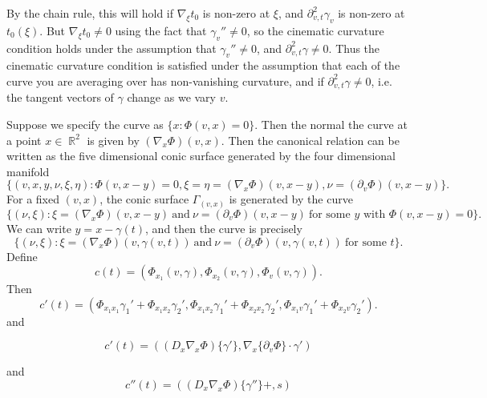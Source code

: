 \documentclass{article}
\theoremstyle{plain}
\theoremstyle{remark}
\theoremstyle{definition}
\DeclareMathOperator{\RR}{\mathbb{R}}
\begin{document}

 By the chain rule, this will hold if $\nabla_\xi t_0$ is non-zero at $\xi$, and $\partial^2_{v,t} \gamma_v$ is non-zero at $t_0(\xi)$. But  $\nabla_\xi t_0 \neq 0$ using the fact that $\gamma_v'' \neq 0$, so the cinematic curvature condition holds under the assumption that $\gamma_v'' \neq 0$, and $\partial^2_{v,t} \gamma \neq 0$. Thus the cinematic curvature condition is satisfied under the assumption that each of the curve you are averaging over has non-vanishing curvature, and if $\partial^2_{v,t} \gamma \neq 0$, i.e. the tangent vectors of $\gamma$ change as we vary $v$.



\newpage

Suppose we specify the curve as $\{ x : \Phi(v,x) = 0 \}$. Then the normal the curve at a point $x \in \RR^2$ is given by $(\nabla_x \Phi)(v,x)$. Then the canonical relation can be written as the five dimensional conic surface generated by the four dimensional manifold
%
\[ \Big\{ (v,x,y,\nu,\xi,\eta) : \Phi(v, x - y) = 0, \xi = \eta = (\nabla_x \Phi)(v,x-y), \nu = (\partial_v \Phi)(v,x - y) \Big\}. \]
%
For a fixed $(v,x)$, the conic surface $\Gamma_{(v,x)}$ is generated by the curve
%
\[ \Big\{ (\nu,\xi) : \xi = (\nabla_x \Phi)(v,x-y)\ \text{and}\ \nu = (\partial_v \Phi)(v, x - y)\ \text{for some $y$ with $\Phi(v,x-y) = 0$} \Big\}. \]
%
We can write $y = x - \gamma(t)$, and then the curve is precisely
%
\[ \Big\{ (\nu,\xi) : \xi = (\nabla_x \Phi)(v, \gamma(v,t) )\ \text{and}\ \nu = (\partial_v \Phi)(v, \gamma(v,t))\ \text{for some $t$} \Big\}. \]
%
Define
%
\[ c(t) = \left( \Phi_{x_1}(v,\gamma), \Phi_{x_2}(v,\gamma), \Phi_v(v, \gamma) \right). \]
%
Then
%
\[ c'(t) = \left( \Phi_{x_1 x_1} \gamma_1' + \Phi_{x_1 x_2} \gamma_2', \Phi_{x_1 x_2} \gamma_1' + \Phi_{x_2 x_2} \gamma_2', \Phi_{x_1 v} \gamma_1' + \Phi_{x_2 v} \gamma_2' \right). \]
%
and
%

\[ c'(t) = \left( (D_x \nabla_x \Phi) \{ \gamma' \}, \nabla_x \{ \partial_v \Phi \} \cdot \gamma' \right) \]
%
%
% 


and
%
\[ c''(t) = ( (D_x \nabla_x \Phi) \{ \gamma'' \} + , s ) \]
\end{document}
